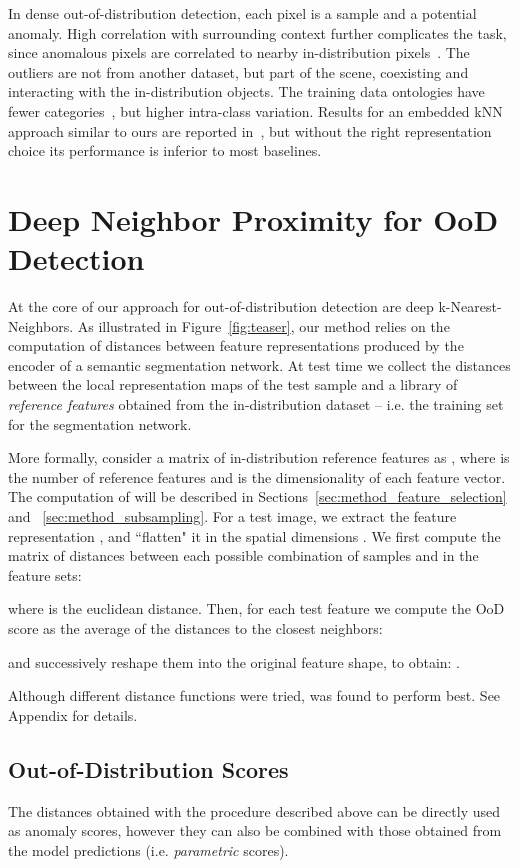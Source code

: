\documentclass[10pt,twocolumn,letterpaper]{article}
\begin{document}
In dense out-of-distribution detection, each pixel is a sample and a potential anomaly.
High correlation with surrounding context further complicates the task, since anomalous pixels are correlated to nearby in-distribution pixels~\cite{a_benchmark, Jung_2021_ICCV}.
The outliers are not from another dataset, but part of the scene, coexisting and interacting with the in-distribution objects.
The training data ontologies have fewer categories~\cite{Cordts2016Cityscapes, a_benchmark}, but higher intra-class variation. Results for an embedded kNN approach similar to ours are reported in~\cite{blum2019fishyscapes}, but without the right representation choice its performance is inferior to most baselines. \section{Deep Neighbor Proximity for OoD Detection}
At the core of our approach for out-of-distribution detection are deep k-Nearest-Neighbors.
As illustrated in Figure~\ref{fig:teaser}, our method relies on the computation of distances between feature representations produced by the encoder of a semantic segmentation network. 
At test time we collect the distances between the local representation maps of the test sample and a library of \textit{reference features} obtained from the in-distribution dataset -- i.e. the training set for the segmentation network.

More formally, consider a matrix of in-distribution reference features as , where  is the number of reference features and  is the dimensionality of each feature vector. The computation of  will be described in Sections~\ref{sec:method_feature_selection} and ~\ref{sec:method_subsampling}.
For a test image, we extract the feature representation , and ``flatten" it in the spatial dimensions .
We first compute the matrix  of distances between each possible combination of samples  and  in the feature sets:

where  is the euclidean distance.
Then, for each test feature  we compute the OoD score as the average of the distances to the closest  neighbors:

and successively reshape them into the original feature shape, to obtain: .

Although different distance functions were tried,  was found to perform best. See Appendix for details.

\subsection{Out-of-Distribution Scores}
\label{sec:methods_ood_scores}
The distances obtained with the procedure described above can be directly used as anomaly scores, however they can also be combined with those obtained from the model predictions (i.e. \textit{parametric} scores).
\end{document}
